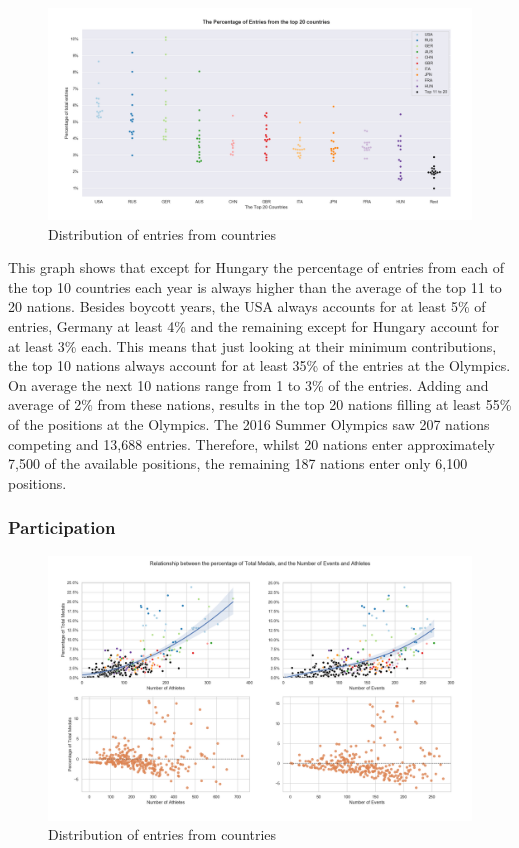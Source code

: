 \documentclass[a4 paper, 12pt]{article}
\begin{document}
        \begin{figure} [H]
            \centering
            \includegraphics[width=\textwidth, frame]
                {./images/graph/countries_entryperc_swarm.png}      
                \caption{Distribution of entries from countries} 
        \end{figure}

        This graph shows that except for Hungary the percentage of entries from each of the top 10 countries each year is always higher than the average of the top 11 to 20 nations. Besides boycott years, the USA always accounts for at least 5\% of entries, Germany at least 4\% and the remaining except for Hungary account for at least 3\% each. This means that just looking at their minimum contributions, the top 10 nations always account for at least 35\% of the entries at the Olympics. On average the next 10 nations range from 1 to 3\% of the entries. Adding and average of 2\% from these nations, results in the top 20 nations filling at least 55\% of the positions at the Olympics. The 2016 Summer Olympics saw 207 nations competing and 13,688 entries. Therefore, whilst 20 nations enter approximately 7,500 of the available positions, the remaining 187 nations enter only 6,100 positions.

        \subsubsection{Participation}

        \begin{figure} [H]
            \centering
            \includegraphics[width=\textwidth, frame]
                {./images/graph/countries_medals_resid.png}      
                \caption{Distribution of entries from countries} 
        \end{figure}
        
\end{document}
